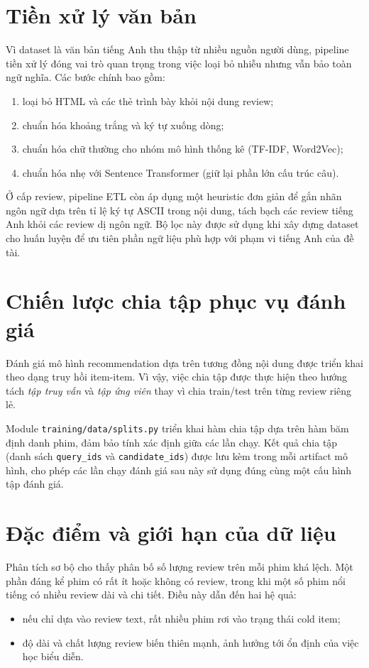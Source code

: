 \section{Tiền xử lý văn bản}
Vì dataset là văn bản tiếng Anh thu thập từ nhiều nguồn người dùng, pipeline tiền xử lý đóng vai trò quan trọng trong việc loại bỏ nhiễu nhưng vẫn bảo toàn ngữ nghĩa. Các bước chính bao gồm:
\begin{enumerate}[label=\arabic*.]
    \item loại bỏ HTML và các thẻ trình bày khỏi nội dung review;
    \item chuẩn hóa khoảng trắng và ký tự xuống dòng;
    \item chuẩn hóa chữ thường cho nhóm mô hình thống kê (TF-IDF, Word2Vec);
    \item chuẩn hóa nhẹ với Sentence Transformer (giữ lại phần lớn cấu trúc câu).
\end{enumerate}

Ở cấp review, pipeline ETL còn áp dụng một heuristic đơn giản để gắn nhãn ngôn ngữ dựa trên tỉ lệ ký tự ASCII trong nội dung, tách bạch các review tiếng Anh khỏi các review dị ngôn ngữ. Bộ lọc này được sử dụng khi xây dựng dataset cho huấn luyện để ưu tiên phần ngữ liệu phù hợp với phạm vi tiếng Anh của đề tài.

\section{Chiến lược chia tập phục vụ đánh giá}
Đánh giá mô hình recommendation dựa trên tương đồng nội dung được triển khai theo dạng truy hồi item-item. Vì vậy, việc chia tập được thực hiện theo hướng tách \emph{tập truy vấn} và \emph{tập ứng viên} thay vì chia train/test trên từng review riêng lẻ.

Module \texttt{training/data/splits.py} triển khai hàm chia tập dựa trên hàm băm định danh phim, đảm bảo tính xác định giữa các lần chạy. Kết quả chia tập (danh sách \texttt{query\_ids} và \texttt{candidate\_ids}) được lưu kèm trong mỗi artifact mô hình, cho phép các lần chạy đánh giá sau này sử dụng đúng cùng một cấu hình tập đánh giá.

\section{Đặc điểm và giới hạn của dữ liệu}
Phân tích sơ bộ cho thấy phân bố số lượng review trên mỗi phim khá lệch. Một phần đáng kể phim có rất ít hoặc không có review, trong khi một số phim nổi tiếng có nhiều review dài và chi tiết. Điều này dẫn đến hai hệ quả:
\begin{itemize}
    \item nếu chỉ dựa vào review text, rất nhiều phim rơi vào trạng thái cold item;
    \item độ dài và chất lượng review biến thiên mạnh, ảnh hưởng tới ổn định của việc học biểu diễn.
\end{itemize}

